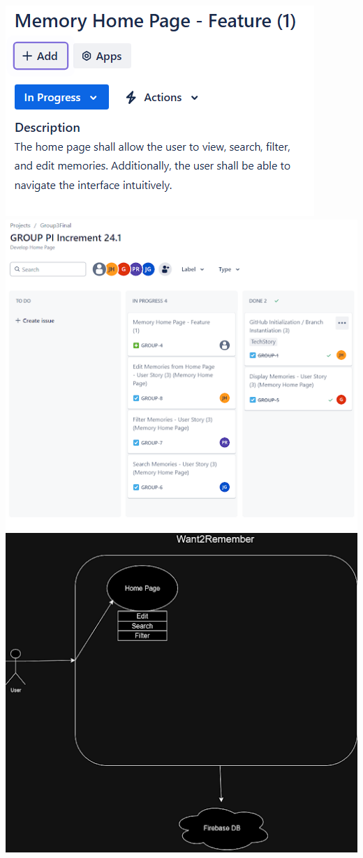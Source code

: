 \documentclass{article}
\begin{document}
\includegraphics{snapshot1img1.png}\newline
\includegraphics{snapshot1img2.png}
\includegraphics{snapshot1img3.png}
\end{document}
